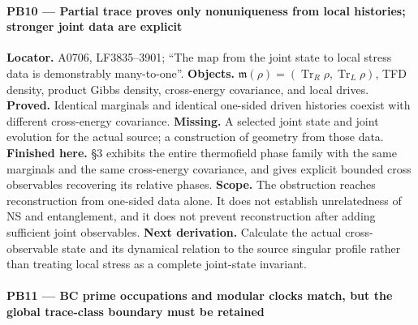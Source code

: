 \documentclass[10pt,a4paper,oneside]{report}
\begin{document}
\paragraph{PB10 --- Partial trace proves only nonuniqueness from local
histories; stronger joint data are
explicit}\label{pb10-partial-trace-proves-only-nonuniqueness-from-local-histories-stronger-joint-data-are-explicit}

\textbf{Locator.} A0706, LF3835--3901; ``The map from the joint state to
local stress data is demonstrably many-to-one''. \textbf{Objects.}
\(\mathfrak m(\rho)=(\operatorname{Tr}_R\rho,\operatorname{Tr}_L\rho)\),
TFD density, product Gibbs density, cross-energy covariance, and local
drives. \textbf{Proved.} Identical marginals and identical one-sided
driven histories coexist with different cross-energy covariance.
\textbf{Missing.} A selected joint state and joint evolution for the
actual source; a construction of geometry from those data.
\textbf{Finished here.} \protect{} §3 exhibits the
entire thermofield phase family with the same marginals and the same
cross-energy covariance, and gives explicit bounded cross observables
recovering its relative phases. \textbf{Scope.} The obstruction reaches
reconstruction from one-sided data alone. It does not establish
unrelatedness of NS and entanglement, and it does not prevent
reconstruction after adding sufficient joint observables. \textbf{Next
derivation.} Calculate the actual cross-observable state and its
dynamical relation to the source singular profile rather than treating
local stress as a complete joint-state invariant.

\paragraph{PB11 --- BC prime occupations and modular clocks match, but
the global trace-class boundary must be
retained}\label{pb11-bc-prime-occupations-and-modular-clocks-match-but-the-global-trace-class-boundary-must-be-retained}
\end{document}
